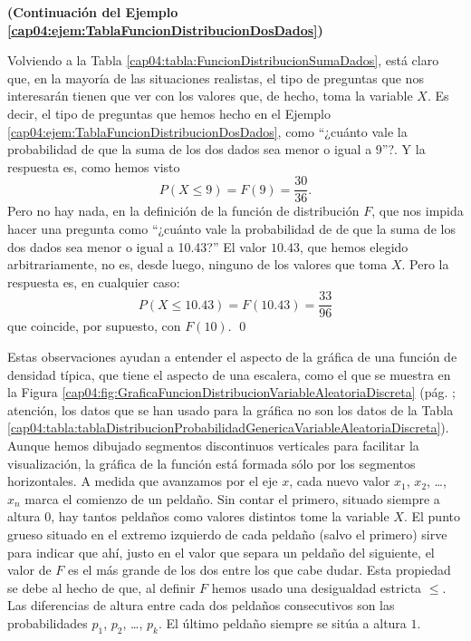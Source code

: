 \begin{ejemplo}
{\bf (Continuación del Ejemplo \ref{cap04:ejem:TablaFuncionDistribucionDosDados})}
\label{cap04:ejem:TablaFuncionDistribucionDosDados02}

Volviendo a la Tabla \ref{cap04:tabla:FuncionDistribucionSumaDados}, está claro que, en la mayoría
de las situaciones realistas, el tipo de preguntas que nos interesarán tienen que ver con los
valores que, de hecho, toma la variable $X$. Es decir, el tipo de preguntas  que hemos hecho en el
Ejemplo \ref{cap04:ejem:TablaFuncionDistribucionDosDados}, como ``¿cuánto vale la probabilidad de
que la suma de los dos dados sea menor o igual a 9''?. Y la respuesta es, como hemos visto
\[P(X\leq 9)=F(9)=\dfrac{30}{36}.\]
Pero no hay nada, en la definición de la función de distribución $F$, que nos impida hacer una pregunta como ``¿cuánto vale la probabilidad de de que la suma de los dos dados sea menor o igual a 10.43?''
El valor $10.43$, que hemos elegido arbitrariamente, no es, desde luego, ninguno de los valores que toma $X$. Pero la respuesta  es, en cualquier caso:
\[P(X\leq 10.43)=F(10.43)=\dfrac{33}{96}\]
que coincide, por supuesto, con $F(10)$.
\qed
\end{ejemplo}
Estas observaciones ayudan a entender el aspecto de la gráfica de una función de densidad típica,
que tiene el aspecto de una escalera, como el que se muestra en la Figura
\ref{cap04:fig:GraficaFuncionDistribucionVariableAleatoriaDiscreta} (pág.
\pageref{cap04:fig:GraficaFuncionDistribucionVariableAleatoriaDiscreta}; atención, los datos que se
han usado para la gráfica no son los datos de la Tabla
\ref{cap04:tabla:tablaDistribucionProbabilidadGenericaVariableAleatoriaDiscreta}). Aunque hemos
dibujado segmentos discontinuos verticales para facilitar la visualización, la gráfica de la
función está formada sólo por los segmentos horizontales. A medida que avanzamos por el eje $x$,
cada nuevo valor $x_1$, $x_2$, \ldots, $x_n$ marca el comienzo de un peldaño. Sin contar el
primero, situado siempre a altura $0$,  hay tantos peldaños como valores distintos tome la variable
$X$. El punto grueso situado en el extremo izquierdo de cada peldaño (salvo el primero) sirve para
indicar que ahí, justo en el valor que separa un peldaño del siguiente, el valor de $F$ es el más
grande de los dos entre los que cabe dudar. Esta propiedad se debe al hecho de que, al definir $F$
hemos usado una desigualdad estricta $\leq$. Las diferencias de altura entre cada dos peldaños
consecutivos son las probabilidades $p_1$, $p_2$, \ldots, $p_k$. El último peldaño siempre se sitúa
a altura $1$.

